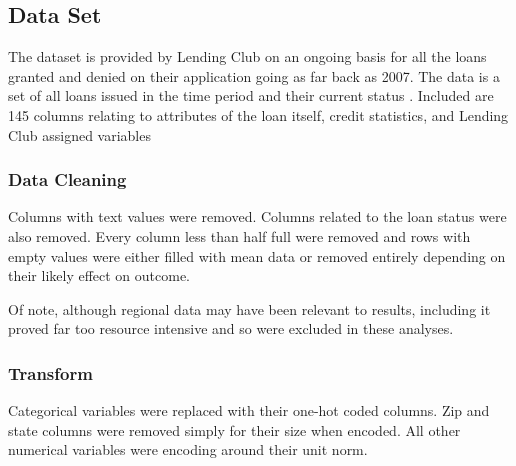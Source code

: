 \subsection{Data Set}

The dataset is provided by Lending Club on an ongoing basis for all the loans granted and denied on their application going as far back as 2007. The data is a set of all loans issued in the time period and their current status \cite{lendingclub}. Included are 145 columns relating to attributes of the loan itself, credit statistics, and Lending Club assigned variables  

\subsubsection{Data Cleaning}

Columns with text values were removed. Columns related to the loan status were also removed.  Every column less than half full were removed and rows with empty values were either filled with mean data or removed entirely depending on their likely effect on outcome.  

Of note, although regional data may have been relevant to results, including it proved far too resource intensive and so were excluded in these analyses.

\subsubsection{Transform}

Categorical variables were replaced with their one-hot coded columns.  Zip and state columns were removed simply for their size when encoded. All other numerical variables were encoding around their unit norm. 